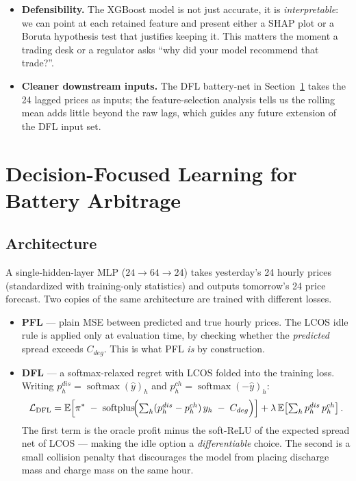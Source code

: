 \documentclass[11pt,a4paper]{article}
\begin{document}
\begin{itemize}[leftmargin=1.5em]
  \item \textbf{Defensibility.} The XGBoost model is not just accurate,
    it is \emph{interpretable}: we can point at each retained feature
    and present either a SHAP plot or a Boruta hypothesis test that
    justifies keeping it. This matters the moment a trading desk or a
    regulator asks ``why did your model recommend that trade?''.

  \item \textbf{Cleaner downstream inputs.} The DFL battery-net in
    Section~\ref{sec:dfl} takes the 24 lagged prices as inputs; the
    feature-selection analysis tells us the rolling mean adds little
    beyond the raw lags, which guides any future extension of the DFL
    input set.
\end{itemize}


\section{Decision-Focused Learning for Battery Arbitrage}\label{sec:dfl}

\subsection{Architecture}
A single-hidden-layer MLP ($24\!\to\!64\!\to\!24$) takes yesterday's 24
hourly prices (standardized with training-only statistics) and outputs
tomorrow's 24 price forecast. Two copies of the same architecture are
trained with different losses.

\begin{itemize}[leftmargin=1.5em]
  \item \textbf{PFL} --- plain MSE between predicted and true hourly
    prices. The LCOS idle rule is applied only at evaluation time, by
    checking whether the \emph{predicted} spread exceeds $C_{deg}$.
    This is what PFL \emph{is} by construction.

  \item \textbf{DFL} --- a softmax-relaxed regret with LCOS folded into
    the training loss. Writing
    $p^{dis}_{h}=\operatorname{softmax}(\hat y)_{h}$ and
    $p^{ch}_{h}=\operatorname{softmax}(-\hat y)_{h}$:
    \[
    \mathcal{L}_{\mathrm{DFL}}
      = \mathbb{E}\!\left[
          \pi^{*}\;-\;\operatorname{softplus}\!\Bigl(
            \textstyle\sum_{h}(p^{dis}_{h}-p^{ch}_{h})\,y_{h}\;-\;C_{deg}
          \Bigr)
        \right]
      + \lambda\,\mathbb{E}\!\left[\textstyle\sum_{h}p^{dis}_{h}\,p^{ch}_{h}\right].
    \]
    The first term is the oracle profit minus the soft-ReLU of the
    expected spread net of LCOS --- making the idle option a
    \emph{differentiable} choice. The second is a small collision
    penalty that discourages the model from placing discharge mass and
    charge mass on the same hour.
\end{itemize}
\end{document}
